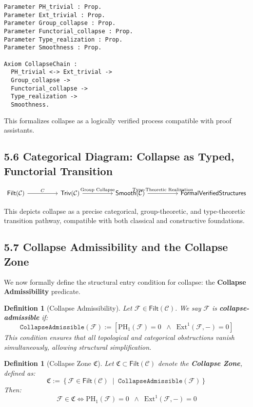 \documentclass[11pt]{article}
\newtheorem{definition}[theorem]{Definition}
\begin{document}
\begin{lstlisting}[language=Coq]
Parameter PH_trivial : Prop.
Parameter Ext_trivial : Prop.
Parameter Group_collapse : Prop.
Parameter Functorial_collapse : Prop.
Parameter Type_realization : Prop.
Parameter Smoothness : Prop.

Axiom CollapseChain :
  PH_trivial <-> Ext_trivial ->
  Group_collapse ->
  Functorial_collapse ->
  Type_realization ->
  Smoothness.
\end{lstlisting}


This formalizes collapse as a logically verified process compatible with proof assistants.

\subsection*{5.6 Categorical Diagram: Collapse as Typed, Functorial Transition}

\[
\begin{tikzcd}[column sep=huge]
\mathsf{Filt}(\mathcal{C}) \arrow[r, "C"]
& \mathsf{Triv}(\mathcal{C}) \arrow[r, "\text{Group Collapse}"]
& \mathsf{Smooth}(\mathcal{C}) \arrow[r, "\text{Type-Theoretic Realization}"]
& \mathsf{Formal Verified Structures}
\end{tikzcd}
\]

This depicts collapse as a precise categorical, group-theoretic, and type-theoretic transition pathway, compatible with both classical and constructive foundations.

\subsection*{5.7 Collapse Admissibility and the Collapse Zone}

We now formally define the structural entry condition for collapse: the \textbf{Collapse Admissibility} predicate.

\begin{definition}[Collapse Admissibility]
Let \( \mathcal{F} \in \mathsf{Filt}(\mathcal{C}) \). We say \( \mathcal{F} \) is \textbf{collapse-admissible} if:
\[
\texttt{CollapseAdmissible}(\mathcal{F}) := \left[
  \mathrm{PH}_1(\mathcal{F}) = 0 \;\; \wedge \;\; \mathrm{Ext}^1(\mathcal{F}, -) = 0
\right]
\]
This condition ensures that all topological and categorical obstructions vanish simultaneously, allowing structural simplification.
\end{definition}

\begin{definition}[Collapse Zone \( \mathfrak{C} \)]
Let \( \mathfrak{C} \subset \mathsf{Filt}(\mathcal{C}) \) denote the \textbf{Collapse Zone}, defined as:
\[
\mathfrak{C} := \left\{ \mathcal{F} \in \mathsf{Filt}(\mathcal{C}) \;\middle|\; \texttt{CollapseAdmissible}(\mathcal{F}) \right\}
\]
Then:
\[
\mathcal{F} \in \mathfrak{C} \iff \mathrm{PH}_1(\mathcal{F}) = 0 \;\; \wedge \;\; \mathrm{Ext}^1(\mathcal{F}, -) = 0
\]
\end{definition}
\end{document}
